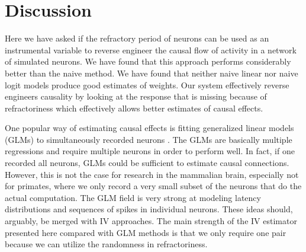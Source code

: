\documentclass[11pt]{article}
\begin{document}
\section{Discussion}

Here we have asked if the refractory period of neurons can be used as an instrumental variable to reverse engineer the causal flow of activity in a network of simulated neurons. We have found that this approach performs considerably better than the naive method. We have found that neither naive linear nor naive logit models produce good estimates of weights. Our system effectively reverse engineers causality by looking at the response that is missing because of refractoriness which effectively allows better estimates of causal effects. 

One popular way of estimating causal effects is fitting generalized linear models (GLMs) to simultaneously recorded neurons \citep{pillow2008spatio}. The GLMs are basically multiple regressions and require multiple neurons in order to perform well. In fact, if one recorded all neurons, GLMs could be sufficient to estimate causal connections. However, this is not the case for research in the mammalian brain, especially not for primates, where we only record a very small subset of the neurons that do the actual computation. The GLM field is very strong at modeling latency distributions and sequences of spikes in individual neurons. These ideas should, arguably, be merged with IV approaches. The main strength of the  IV estimator presented here compared with GLM methods is that we only require one pair because we can utilize the randomness in refractoriness. 

\end{document}
